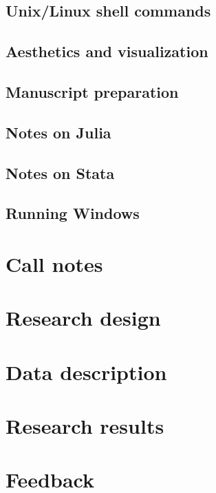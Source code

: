 \documentclass{report}
\numberwithin{equation}{section}
\numberwithin{figure}{section}
\numberwithin{table}{section}
\begin{document}
\section{Unix/Linux shell commands} 
\section{Aesthetics and visualization} 
\section{Manuscript preparation} 
\section{Notes on Julia} 
\section{Notes on Stata} 
\section{Running Windows} 

\chapter{Call notes}

\chapter{Research design}

\chapter{Data description}

\chapter{Research results}

\chapter{Feedback}

\end{document}
